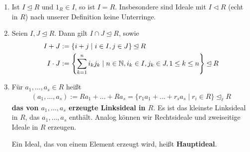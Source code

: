 \begin{rem}\label{rem4_8}
	\begin{enumerate}[label=(\roman*)]
		\item Ist $I \unlhd R$ und $1_R \in I$, so ist $I = R$. Insbesondere sind Ideale mit $I \lhd R$ (echt in $R$) nach unserer Definition keine Unterringe.
		\item Seien $I,J \unlhd R$. Dann gilt $I \cap J \unlhd R$, sowie 
		\begin{align*}
			I + J &:= \{i+j \mid i \in I, j \in J\} \unlhd R\\
			I \cdot J &:= \left\{\sum_{k=1}^n i_k j_k \mid n \in \mathbb{N}, i_k \in I, j_k \in J, 1 \leq k \leq n\right\} \unlhd R	
		\end{align*}
		\item Für $a_1, \dots, a_s \in R$ heißt 
		\begin{align*}
			(a_1, \dots, a_s) := Ra_1 + \dots + Ra_s = \{r_1a_1 + \dots + r_sa_s \mid r_i \in R\} \unlhd_\ell R
		\end{align*}
		\textbf{das von $a_1, \dots, a_s$ erzeugte Linksideal in $R$}. Es ist das kleinste Linksideal in $R$, das $a_1, \dots, a_s$ enthält. Analog können wir Rechtsideale und zweiseitige Ideale in $R$ erzeugen.
		
		Ein Ideal, das von einem Element erzeugt wird, heißt \textbf{Hauptideal}.
	\end{enumerate}
\end{rem}

